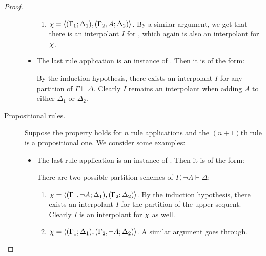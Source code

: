 \begin{proof}
\begin{description}
\begin{itemize}
\begin{enumerate}
						\item $\chi =  \langle (\Gamma_1; \Delta_1), (\Gamma_2, A; \Delta_2)\rangle $.
							By a similar argument, we get that there is an interpolant $I$ for 
							, which again is also an interpolant for $\chi$.

					\end{enumerate}

				\item The last rule application is an instance of . Then it is of the form:
					\begin{prooftree}
						\Axiomm{\Gamma \fCenter \Delta}
					\end{prooftree}

					By the induction hypothesis, there exists an interpolant $I$ for any partition  of $\Gamma \vdash \Delta$.
					Clearly $I$ remains an interpolant when adding $A$ to either $\Delta_1$ or $\Delta_2$.

			\end{itemize}

		\item[\normalfont Propositional rules.]
			Suppose the property holds for $n$ rule applications and the $(n+1)$th rule is a propositional one.
			We consider some examples:

			\begin{itemize}
				\item The last rule application is an instance of . Then it is of the form:
					\begin{prooftree}
						\Axiomm{\Gamma \fCenter \Delta,  A}
						\RightLabelm{\lkrule{\lnot}{l}}
						\UnaryInfm{\lnot A, \Gamma \fCenter \Delta }
					\end{prooftree}

					There are two possible partition schemes of $\Gamma, \lnot A \vdash \Delta$:
					\begin{enumerate}
						\item $\chi =  \langle (\Gamma_1, \lnot A; \Delta_1), (\Gamma_2; \Delta_2)\rangle $.
							By the induction hypothesis, there exists an interpolant $I$ for the partition  of the upper sequent.
							Clearly $I$ is an interpolant for $\chi$ as well.

						\item $\chi =  \langle (\Gamma_1; \Delta_1), (\Gamma_2, \lnot A; \Delta_2)\rangle $. A similar argument goes through. 
					\end{enumerate}


\end{itemize}
\end{description}
\end{proof}
